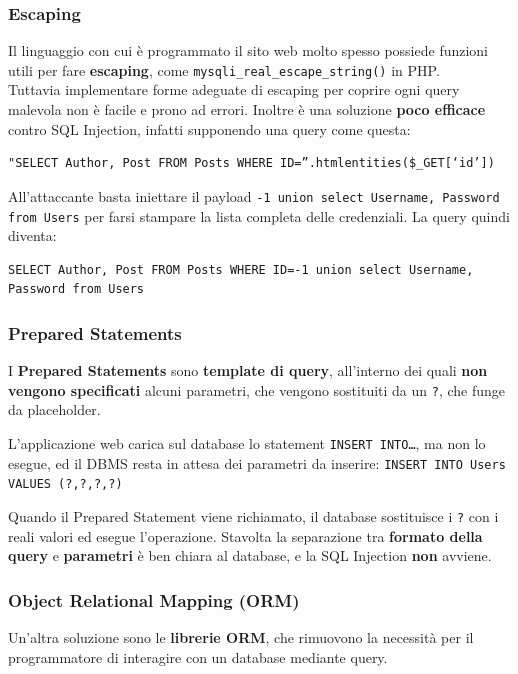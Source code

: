 \documentclass{article}
\begin{document}
\subsubsection{Escaping}
Il linguaggio con cui è programmato il sito web molto spesso possiede funzioni utili per fare \textbf{escaping}, come \verb|mysqli_real_escape_string()| in PHP.\\
Tuttavia implementare forme adeguate di escaping per coprire ogni query malevola non è facile e prono ad errori. Inoltre è una soluzione \textbf{poco efficace} contro SQL Injection, infatti supponendo una query come questa:
\begin{verbatim}
"SELECT Author, Post FROM Posts WHERE ID=”.htmlentities($_GET[‘id’])
\end{verbatim}

All’attaccante basta iniettare il payload \verb|-1 union select Username, Password from Users| per farsi stampare la lista completa delle credenziali. La query quindi diventa:
\begin{verbatim}
SELECT Author, Post FROM Posts WHERE ID=-1 union select Username, Password from Users
\end{verbatim}

\newpage
\subsubsection{Prepared Statements}
I \textbf{Prepared Statements} sono \textbf{template di query},  all’interno dei quali \textbf{non vengono specificati} alcuni parametri, che vengono sostituiti da un \verb|?|, che funge da placeholder.

L'applicazione web carica sul database lo statement \verb|INSERT INTO…|, ma non lo esegue, ed il DBMS resta in attesa dei parametri da inserire:
\verb|INSERT INTO Users VALUES (?,?,?,?)|

Quando il Prepared Statement viene richiamato, il database sostituisce i \verb|?| con i reali valori ed esegue l’operazione. Stavolta la separazione tra \textbf{formato della query} e \textbf{parametri} è ben chiara al database, e la SQL Injection \textbf{non} avviene.

\subsubsection{Object Relational Mapping (ORM)}
Un'altra soluzione sono le \textbf{librerie ORM}, che rimuovono la necessità per il programmatore di interagire con un database mediante query.
\end{document}

